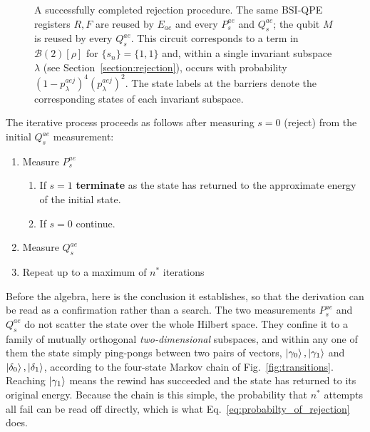 \documentclass[aps,floatfix,10pt,amssymb,amsfont,amsmath,superscriptaddress,float,nofootinbib,longbibliography,nobalancelastpage,twocolumn]{revtex4-2}
\begin{document}
\begin{figure}
\caption{A successfully completed rejection procedure. The same BSI-QPE registers $R, F$ are reused by $E_{ae}$ and every $P_s^{ae}$ and $Q_s^{ae}$; the qubit $M$ is reused by every $Q_s^{ae}$. This circuit corresponds to a term in $\mathcal{B}(2)[\rho]$ for $\{s_n\}=\{1,1\}$ and, within a single invariant subspace $\lambda$ (see Section~\ref{section:rejection}), occurs with probability $(1-p^{aej}_{\lambda})^4(p^{aej}_{\lambda})^2$. The state labels at the barriers denote the corresponding states of each invariant subspace.}
\label{fig:fullcircuit}
\end{figure}

The iterative process proceeds as follows after measuring $s=0$ (reject) from the initial $Q_s^{ae}$ measurement: 
\begin{enumerate}
    \item Measure $P_s^{ae}$
        \begin{enumerate}
            \item If $s=1$ \textbf{terminate} as the state has returned to the approximate energy of the initial state.
            \item If $s=0$ continue.
        \end{enumerate}
    \item Measure $Q_s^{ae}$
    \item Repeat up to a maximum of $n^*$ iterations
\end{enumerate}


Before the algebra, here is the conclusion it establishes, so that the derivation can be read as a confirmation rather than a search. The two measurements $P^{ae}_s$ and $Q^{ae}_s$ do not scatter the state over the whole Hilbert space. They confine it to a family of mutually orthogonal \emph{two-dimensional} subspaces, and within any one of them the state simply ping-pongs between two pairs of vectors, $\ket{\gamma_0},\ket{\gamma_1}$ and $\ket{\delta_0},\ket{\delta_1}$, according to the four-state Markov chain of Fig.~\ref{fig:transitions}. Reaching $\ket{\gamma_1}$ means the rewind has succeeded and the state has returned to its original energy. Because the chain is this simple, the probability that $n^*$ attempts all fail can be read off directly, which is what Eq.~\eqref{eq:probabilty_of_rejection} does.
\end{document}
